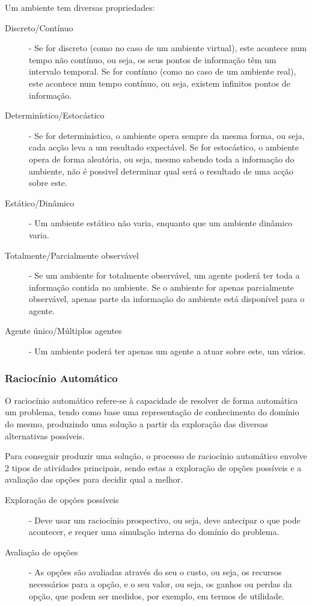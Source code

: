 \documentclass[a4paper,12pt]{article}
\begin{document}
Um ambiente tem diversas propriedades:
\begin{description}
	\item[Discreto/Contínuo] - Se for discreto (como no caso de um ambiente virtual), este acontece num tempo não contínuo, ou seja, os seus pontos de informação têm um intervalo temporal. Se for contínuo (como no caso de um ambiente real), este acontece num tempo contínuo, ou seja, existem infinitos pontos de informação.
	\item[Determinístico/Estocástico] - Se for determinístico, o ambiente opera sempre da mesma forma, ou seja, cada acção leva a um resultado expectável. Se for estocástico, o ambiente opera de forma aleatória, ou seja, mesmo sabendo toda a informação do ambiente, não é possivel determinar qual será o resultado de uma acção sobre este.
	\item[Estático/Dinâmico] - Um ambiente estático não varia, enquanto que um ambiente dinâmico varia.
	\item[Totalmente/Parcialmente observável] - Se um ambiente for totalmente observável, um agente poderá ter toda a informação contida no ambiente. Se o ambiente for apenas parcialmente observável, apenas parte da informação do ambiente está disponível para o agente.
	\item[Agente único/Múltiplos agentes] - Um ambiente poderá ter apenas um agente a atuar sobre este, um vários.
\end{description}

\subsubsection{Raciocínio Automático} \label{raciocinio_automatico}

O raciocínio automático refere-se à capacidade de resolver de forma automática um problema, tendo como base uma representação de conhecimento do domínio do mesmo, produzindo uma solução a partir da exploração das diversas alternativas possíveis.

Para conseguir produzir uma solução, o processo de raciocínio automático envolve 2 tipos de atividades principais, sendo estas a exploração de opções possíveis e a avaliação das opções para decidir qual a melhor.

\begin{description}
	\item[Exploração de opções possíveis] - Deve usar um raciocínio prospectivo, ou seja, deve antecipar o que pode acontecer, e requer uma simulação interna do domínio do problema.
	\item[Avaliação de opções] - As opções são avaliadas através do seu o custo, ou seja, os recursos necessários para a opção, e o seu valor, ou seja, os ganhos ou perdas da opção, que podem ser medidos, por exemplo, em termos de utilidade.
\end{description}
\end{document}
